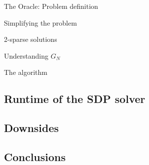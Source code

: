 \begin{frame}{The Oracle: Problem definition}

\end{frame}

\begin{frame}{Simplifying the problem}

\end{frame}

\begin{frame}{2-sparse solutions}

\end{frame}

\begin{frame}{Understanding $G_N$}

\end{frame}

\begin{frame}{The algorithm}

\end{frame}

\subsection{Runtime of the SDP solver}

\subsection{Downsides}

\subsection{Conclusions}